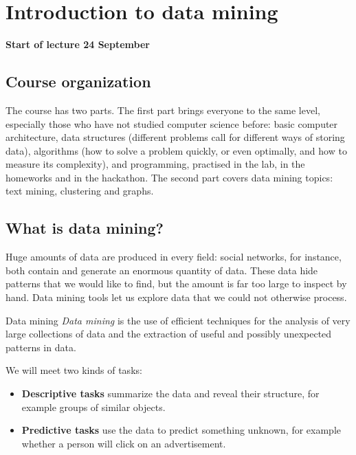 \documentclass[a4paper,12pt,oneside]{report}
\newcommand{\lecturebanner}[1]{%
  \Needspace{6\baselineskip}%
  \begin{tcolorbox}[colback=yellow!20,colframe=yellow!60!black,
    boxrule=0.4pt,arc=1mm,left=5pt,right=5pt,top=3pt,bottom=3pt,
    before skip=6pt,after skip=6pt]
  \small\textbf{#1}
  \end{tcolorbox}}
\newcommand{\lecturestart}[1]{\lecturebanner{Start of lecture #1}}
\begin{document}
\makenotestitle
\notescontents

\chapter{Introduction to data mining}

\lecturestart{24 September}

\section{Course organization}

The course has two parts. The first part brings everyone to the same
level, especially those who have not studied computer science before:
basic computer architecture, data structures (different problems call
for different ways of storing data), algorithms (how to solve a problem
quickly, or even optimally, and how to measure its complexity), and
programming, practised in the lab, in the homeworks and in the
hackathon. The second part covers data mining topics: text mining,
clustering and graphs.

\section{What is data mining?}

Huge amounts of data are produced in every field: social networks,
for instance, both contain and generate an enormous quantity of data.
These data hide patterns that we would like to find, but the amount is
far too large to inspect by hand. Data mining tools let us explore
data that we could not otherwise process.

\begin{frameddefn}{Data mining}\label{def:data-mining}
\emph{Data mining} is the use of efficient techniques for the analysis
of very large collections of data and the extraction of useful and
possibly unexpected patterns in data.
\end{frameddefn}

We will meet two kinds of tasks:
\begin{itemize}
  \item \textbf{Descriptive tasks} summarize the data and reveal their
    structure, for example groups of similar objects.
  \item \textbf{Predictive tasks} use the data to predict something
    unknown, for example whether a person will click on an advertisement.
\end{itemize}
\end{document}
